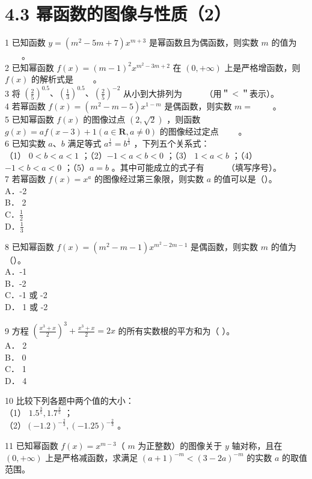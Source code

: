 \documentclass[10pt]{article}
\begin{document}
\section*{4.3 幂函数的图像与性质（2）}
1 已知函数 \(y=\left(m^{2}-5 m+7\right) x^{m+3}\) 是幂函数且为偶函数，则实数 \(m\) 的值为 \(\qquad\)。\\
2 已知幂函数 \(f(x)=(m-1)^{2} x^{m^{2}-3 m+2}\) 在 \((0,+\infty)\) 上是严格增函数，则 \(f(x)\) 的解析式是 \(\qquad\)。\\
3 将 \(\left(\frac{2}{5}\right)^{0.5} 、\left(\frac{1}{3}\right)^{0.5} 、\left(\frac{2}{5}\right)^{-2}\) 从小到大排列为 \(\qquad\) （用＂\(<\)＂表示）。\\
4 若幂函数 \(f(x)=\left(m^{2}-m-5\right) x^{1-m}\) 是偶函数，则实数 \(m=\) \(\qquad\)。\\
5 已知幂函数 \(f(x)\) 的图像过点 \((2, \sqrt{2})\) ，则函数 \(g(x)=a f(x-3)+1(a \in \mathbf{R}, a \neq 0)\) 的图像经过定点 \(\qquad\)。\\
6 已知实数 \(a 、 b\) 满足等式 \(a^{\frac{1}{2}}=b^{\frac{1}{3}}\) ，下列五个关系式：\\
（1） \(0<b<a<1\) ；（2）\(-1<a<b<0\) ；（3） \(1<a<b\) ；（4）\(-1<b<a<0\) ；（5）\(a=b\) 。其中可能成立的式子有 \(\qquad\) （填写序号）。\\
7 若幂函数 \(f(x)=x^{a}\) 的图像经过第三象限，则实数 \(a\) 的值可以是（）。\\
A．-2\\
B． 2\\
C．\(\frac{1}{2}\)\\
D．\(\frac{1}{3}\)

8 已知幂函数 \(f(x)=\left(m^{2}-m-1\right) x^{m^{2}-2 m-1}\) 是偶函数，则实数 \(m\) 的值为（）。\\
A．-1\\
B．-2\\
C．-1 或 -2\\
D． 1 或 -2

9 方程 \(\left(\frac{x^{3}+x}{2}\right)^{3}+\frac{x^{3}+x}{2}=2 x\) 的所有实数根的平方和为（ ）。\\
A． 2\\
B． 0\\
C． 1\\
D． 4

10 比较下列各题中两个值的大小：\\
（1） \(1.5^{\frac{3}{5}}, 1.7^{\frac{3}{5}}\) ；\\
（2）\((-1.2)^{-\frac{2}{3}},(-1.25)^{-\frac{2}{3}}\) 。

11 已知幂函数 \(f(x)=x^{m-3}\)（ \(m\) 为正整数）的图像关于 \(y\) 轴对称，且在 \((0,+\infty)\) 上是严格减函数，求满足 \((a+1)^{-m}<(3-2 a)^{-m}\) 的实数 \(a\) 的取值范围。
\end{document}
